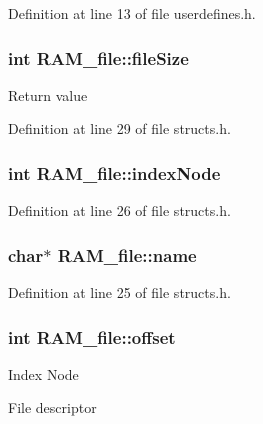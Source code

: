 Definition at line 13 of file userdefines.\-h.

\hypertarget{struct_r_a_m__file_aaa19f9267c6de8acebcab0918d9e3d92}{
\subsubsection[{file\-Size}]{\setlength{\rightskip}{0pt plus 5cm}int R\-A\-M\-\_\-file\-::file\-Size}}\label{struct_r_a_m__file_aaa19f9267c6de8acebcab0918d9e3d92}
Return value 

Definition at line 29 of file structs.\-h.

\hypertarget{struct_r_a_m__file_a2e9f0e53a40cfa76ff19c4abf2cb160a}{
\subsubsection[{index\-Node}]{\setlength{\rightskip}{0pt plus 5cm}int R\-A\-M\-\_\-file\-::index\-Node}}\label{struct_r_a_m__file_a2e9f0e53a40cfa76ff19c4abf2cb160a}


Definition at line 26 of file structs.\-h.

\hypertarget{struct_r_a_m__file_ae1d9b6bcd499d80f7889b1b42edaa44e}{
\subsubsection[{name}]{\setlength{\rightskip}{0pt plus 5cm}char$\ast$ R\-A\-M\-\_\-file\-::name}}\label{struct_r_a_m__file_ae1d9b6bcd499d80f7889b1b42edaa44e}


Definition at line 25 of file structs.\-h.

\hypertarget{struct_r_a_m__file_ab1bae1169c15ff2e8ff6b41b9b97764e}{
\subsubsection[{offset}]{\setlength{\rightskip}{0pt plus 5cm}int R\-A\-M\-\_\-file\-::offset}}\label{struct_r_a_m__file_ab1bae1169c15ff2e8ff6b41b9b97764e}
Index Node

File descriptor 

